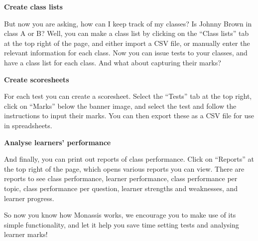 {\textbf{Create class lists}\par 

But now you are asking, how can I keep track of my classes? Is Johnny Brown in class A or B? Well, you can make a class list by clicking on the “Class lists” tab at the top right of the page, and either import a CSV file, or manually enter the relevant information for each class. Now you can issue tests  to your classes, and have a class list for each class. And what about capturing their marks?\par 

\textbf{Create scoresheets}\par 
For each test you can create a scoresheet. Select the “Tests” tab at the top right, click on “Marks” below the banner image, and select the test and follow the instructions to input their marks. You can then export these as a CSV file for use in spreadsheets.\par 

\textbf{Analyse learners' performance}\par 

And finally, you can print out reports of class performance. Click on “Reports” at the top right of the page, which opens various reports you can view. There are reports to see class performance, learner performance, class performance per topic, class performance per question, learner strengths and weaknesses, and learner progress.\par 
So now you know how Monassis works, we encourage you to make use of its simple functionality, and let it help you save time setting tests and analysing learner marks!\par 

}





